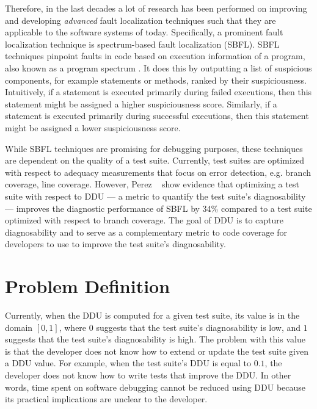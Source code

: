 \documentclass[twoside,a4paper,11pt]{memoir}
\begin{document}
Therefore, in the last decades a lot of research has been performed on improving and developing \emph{advanced} fault localization techniques \cite{wong2016survey} such that they are applicable to the software systems of today.
Specifically, a prominent fault localization technique is spectrum-based fault localization (SBFL).
SBFL techniques pinpoint faults in code based on execution information of a program, also known as a program spectrum \cite{reps1997use}.
It does this by outputting a list of suspicious components, for example statements or methods, ranked by their suspiciousness.
Intuitively, if a statement is executed primarily during failed executions, then this statement might be assigned a higher suspiciousness score.
Similarly, if a statement is executed primarily during successful executions, then this statement might be assigned a lower suspiciousness score.

While SBFL techniques are promising for debugging purposes, these techniques are dependent on the quality of a test suite.
Currently, test suites are optimized with respect to adequacy measurements that focus on error detection, e.g. branch coverage, line coverage.
However, Perez \etal~\cite{DBLP:conf/icse/PerezAD17} show evidence that optimizing a test suite with respect to DDU --- a metric to quantify the test suite's diagnosability --- improves the diagnostic performance of SBFL by 34\% compared to a test suite optimized with respect to branch coverage.
The goal of DDU is to capture diagnosability and to serve as a complementary metric to code coverage for developers to use to improve the test suite's diagnosability.

\section{Problem Definition}
\label{sec:problem_definition}
Currently, when the DDU is computed for a given test suite, its value is in the domain $[ 0, 1 ]$, where $0$ suggests that the test suite's diagnosability is low, and $1$ suggests that the test suite's diagnosability is high.
The problem with this value is that the developer does not know how to extend or update the test suite given a DDU value.
For example, when the test suite's DDU is equal to $0.1$, the developer does not know how to write tests that improve the DDU.
In other words, time spent on software debugging cannot be reduced using DDU because its practical implications are unclear to the developer.
\end{document}
